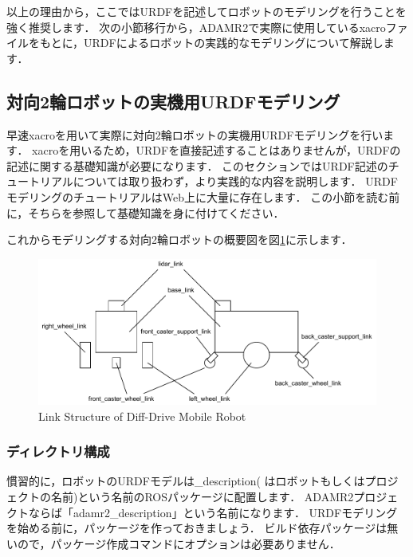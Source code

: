 \documentclass[{../../master}]{subfiles}
\begin{document}
以上の理由から，ここではURDFを記述してロボットのモデリングを行うことを強く推奨します．
次の小節移行から，ADAMR2で実際に使用している\textsf{xacro}ファイルをもとに，URDFによるロボットの実践的なモデリングについて解説します．

\subsection{対向2輪ロボットの実機用URDFモデリング}

早速\textsf{xacro}を用いて実際に対向2輪ロボットの実機用URDFモデリングを行います．
\textsf{xacro}を用いるため，URDFを直接記述することはありませんが，URDFの記述に関する基礎知識が必要になります．
このセクションではURDF記述のチュートリアルについては取り扱わず，より実践的な内容を説明します．
URDFモデリングのチュートリアルはWeb上に大量に存在します．
この小節を読む前に，そちらを参照して基礎知識を身に付けてください．

これからモデリングする対向2輪ロボットの概要図を図\ref{fig:mobile_robot_structure}に示します．

\begin{figure}[ht]
  \centering
  \includegraphics[width=100truemm, clip]{images/mobile_robot_structure.pdf}
  \caption{Link Structure of Diff-Drive Mobile Robot}
  \label{fig:mobile_robot_structure}
\end{figure}

\subsubsection{ディレクトリ構成}

慣習的に，ロボットのURDFモデルは\textsf{\*\_description}(\* はロボットもしくはプロジェクトの名前)という名前のROSパッケージに配置します．
ADAMR2プロジェクトならば「\textsf{adamr2\_description}」という名前になります．
URDFモデリングを始める前に，パッケージを作っておきましょう．
ビルド依存パッケージは無いので，パッケージ作成コマンドにオプションは必要ありません．
\end{document}
